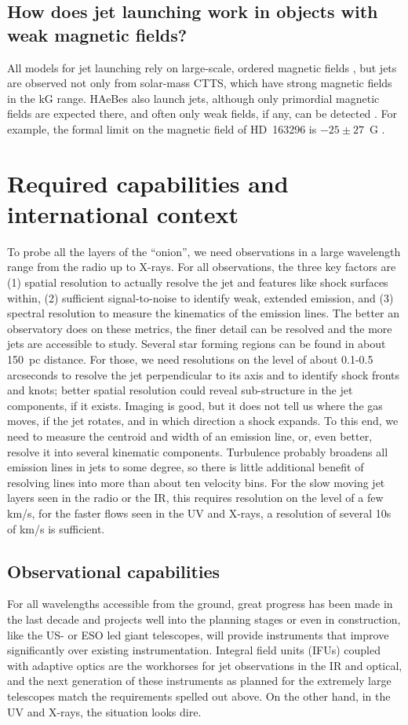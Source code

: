 \documentclass[12pt]{article}
\begin{document}
\subsection{How does jet launching work in objects with weak magnetic fields?}
All models for jet launching rely on large-scale, ordered magnetic fields \citep{2009ASSP...13...99F}, but jets are observed not only from solar-mass CTTS, which have strong magnetic fields in the kG range. HAeBes also launch jets, although only primordial magnetic fields are expected there, and often only weak fields, if any, can be detected \citep{2007A&A...463.1039H,2007MNRAS.376.1145W}. For example, the formal limit on the magnetic field of HD~163296 is $-25\pm 27$~G \citep{2007A&A...463.1039H}. 


\section{Required capabilities and international context}
To probe all the layers of the ``onion'', we need observations in a large
wavelength range from the radio up to X-rays. For all observations, the three
key factors are (1) spatial resolution to actually resolve the jet and features
like shock surfaces within, (2) sufficient signal-to-noise to identify weak, extended
emission, and (3) spectral resolution to measure the kinematics of the emission
lines. The better an observatory does on these metrics, the finer detail can be
resolved and the more jets are accessible to study. Several star forming
regions can be found in about 150~pc distance. For those, we need resolutions
on the level of about 0.1-0.5 arcseconds to resolve the jet perpendicular to
its axis and to identify shock fronts and knots; better spatial resolution
could reveal sub-structure in the jet components, if it exists. Imaging is
good, but it does not tell us where the gas moves, if the jet rotates, and in
which direction a shock expands. To this end, we need to measure the centroid and
width of an emission line, or, even better, resolve it into several kinematic
components. Turbulence probably broadens all emission lines in jets to some
degree, so there is little additional benefit of resolving lines into more than
about ten velocity bins. For the slow moving jet layers seen in the radio or the IR, this requires resolution on the level of a few km/s, for the faster flows seen in the UV and X-rays, a resolution of several 10s of km/s is sufficient.

\subsection{Observational capabilities}
For all wavelengths accessible from the ground, great progress has been made in the last decade and projects well into the planning stages or even in construction, like the US- or ESO led giant telescopes, will provide instruments that improve significantly over existing instrumentation. Integral field units (IFUs) coupled with adaptive optics are the workhorses for jet observations in the IR and optical, and the next generation of these instruments as planned for the extremely large telescopes match the requirements spelled out above. On the other hand, in the UV and X-rays, the situation looks dire. 
\end{document}
